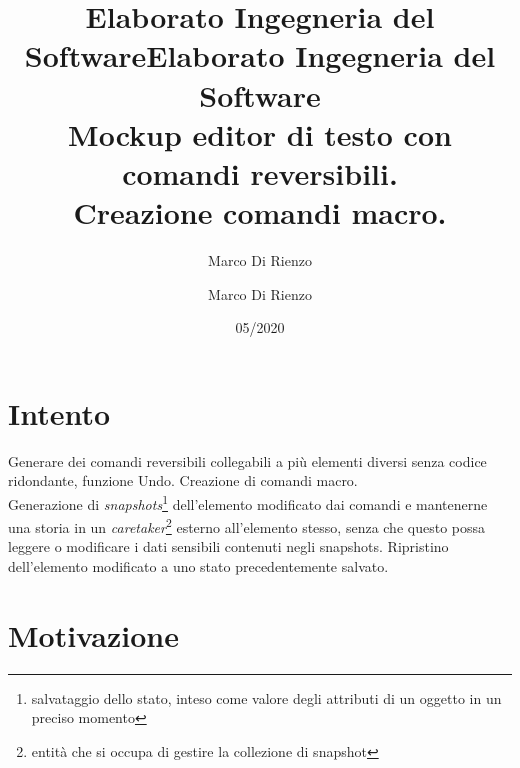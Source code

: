 \documentclass[12pt]{article}
\title{Elaborato Ingegneria del Software}
\author{Marco Di Rienzo }
\title{Elaborato Ingegneria del Software \\
\hfill \break \large Mockup editor di testo con comandi reversibili.\\
Creazione comandi macro.}
\author{Marco Di Rienzo}
\date{05/2020}
\begin{document}
\maketitle
\newpage
\tableofcontents 

\newpage
\section{Intento}
Generare dei comandi reversibili collegabili a più elementi diversi senza codice ridondante, funzione Undo.
Creazione di comandi macro.\\
Generazione di \emph{snapshots}\footnote{salvataggio dello stato, inteso come valore degli attributi di un oggetto in un preciso momento} dell'elemento modificato dai comandi e mantenerne una storia in un \emph{caretaker}\footnote{entità che si occupa di gestire la collezione di snapshot} esterno all'elemento stesso, senza che questo possa leggere o modificare i dati sensibili contenuti negli snapshots.
Ripristino dell'elemento modificato a uno stato precedentemente salvato.

\section{Motivazione}
\end{document}
